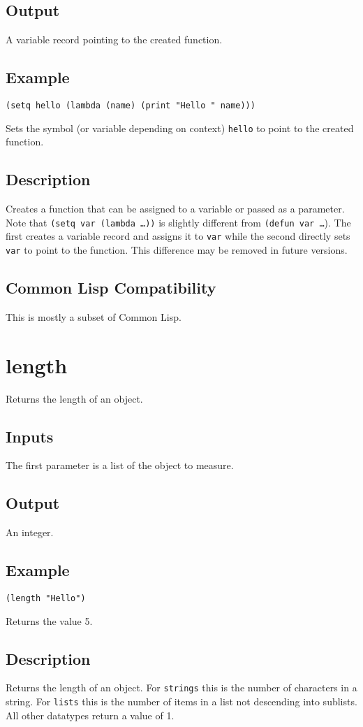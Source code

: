 \documentclass[10pt, openany]{book}
\newcommand{\keyword}[1]{\texttt{#1}}
\newcommand{\datatype}[1]{\texttt{#1}}
\newcommand{\cl}{Common Lisp}
\begin{document}
\subsection{Output}
A variable record pointing to the created function.
\subsection{Example}
\begin{lstlisting}
(setq hello (lambda (name) (print "Hello " name)))
\end{lstlisting}
Sets the symbol (or variable depending on context) \keyword{hello} to point to the created function.
\subsection{Description}
Creates a function that can be assigned to a variable or passed as a parameter.  Note that \keyword{(setq var (lambda \dots))} is slightly different from \keyword{(defun var \dots}).  The first creates a variable record and assigns it to \keyword{var} while the second directly sets \keyword{var} to point to the function.  This difference may be removed in future versions.
\subsection{Common Lisp Compatibility}
This is mostly a subset of \cl.

\section{length}
Returns the length of an object.
\subsection{Inputs}
The first parameter is a list of the object to measure.
\subsection{Output}
An integer.
\subsection{Example}
\begin{lstlisting}
(length "Hello")
\end{lstlisting}
Returns the value 5.
\subsection{Description}
Returns the length of an object.  For \datatype{strings} this is the number of characters in a string.  For \datatype{lists} this is the number of items in a list not descending into sublists.  All other datatypes return a value of 1.
\end{document}

